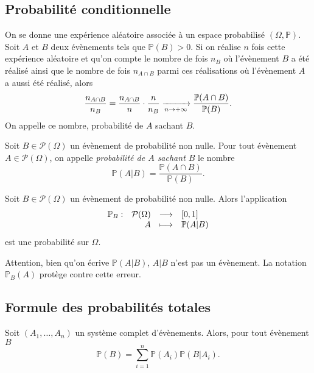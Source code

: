\documentclass{magnolia}
\begin{document}
\subsection{Probabilité conditionnelle}

On se donne une expérience aléatoire associée à un espace probabilisé $(\Omega,\mathbb{P})$.
Soit $A$ et $B$ deux évènements tels que $\mathbb{P}(B)>0$. Si on réalise $n$ fois cette
expérience aléatoire et qu'on compte le nombre de fois $n_B$ où l'évènement $B$ a été réalisé
ainsi que le nombre de fois $n_{A\cap B}$ parmi ces réalisations où l'évènement $A$ a aussi
été réalisé, alors
\[\frac{n_{A\cap B}}{n_B}=\frac{n_{A\cap B}}{n}\cdot\frac{n}{n_B}
  \xrightarrow[n\rightarrow +\infty]{} \frac{\mathbb{P}(A\cap B)}{\mathbb{P}(B)}.\]
On appelle ce nombre, probabilité de $A$ sachant $B$.

\begin{definition}
Soit $B\in\mathcal{P}(\Omega)$ un évènement
de probabilité non nulle. Pour tout évènement $A\in\mathcal{P}(\Omega)$, on appelle
\emph{probabilité de $A$ sachant $B$} le nombre
\[\mathbb{P}(A|B)=\frac{\mathbb{P}(A\cap B)}{\mathbb{P}(B)}.\]
\end{definition}

\begin{proposition}
Soit $B\in\mathcal{P}(\Omega)$ un évènement
de probabilité non nulle. Alors l'application
\[\begin{array}[t]{lrcl} \displaystyle{\mathbb{P}_B} : & \displaystyle{\mathcal{P}(\Omega)} & \longrightarrow & \displaystyle{\left[0,1\right]} \\ & \displaystyle{A} & \longmapsto & \displaystyle{\mathbb{P}(A|B)} \end{array}\]
est une probabilité sur $\Omega$.
\end{proposition}

\begin{remarqueUnique}
\remarque Attention, bien qu'on écrive $\mathbb{P}(A|B)$, $A|B$ n'est pas un évènement.
  La notation $\mathbb{P}_B(A)$ protège contre cette erreur.
\end{remarqueUnique}

\subsection{Formule des probabilités totales}

\begin{proposition}[nom={Formule des probabilités totales}]
Soit $(A_1,\ldots,A_n)$ un système complet d'évènements. Alors, pour tout évènement $B$
\[\mathbb{P}(B)=\sum_{i=1}^n \mathbb{P}(A_i)\mathbb{P}(B|A_i).\]
\end{proposition}
\end{document}
